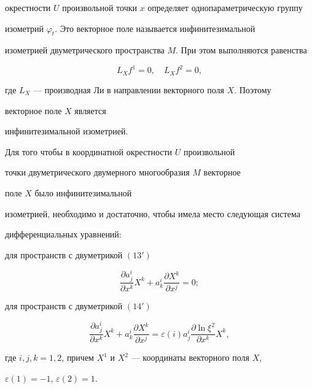 окрестности $U$ произвольной точки $x$ определяет однопараметрическую группу


изометрий $\varphi_t$. Это векторное поле называется инфинитезимальной


изометрией двуметрического пространства $M$. При этом выполняются равенства


$$


L_Xf^1=0,\quad L_Xf^2=0,


$$


где $L_X$ --- производная Ли в направлении векторного поля $X$. Поэтому 


векторное поле $X$ является


инфинитезимальной изометрией.





\begin{thm}


Для того чтобы в координатной окрестности $U$ произвольной


точки двуметрического двумерного многообразия $M$ векторное 


поле $X$ было инфинитезимальной


изометрией, необходимо и достаточно, чтобы имела место следующая система


дифференциальных уравнений\/${:}$





для пространств с двуметрикой $(13')$


\begin{equation}


\frac{\partial a_j^i}{\partial x^k}X^k+a_k^i


\frac{\partial X^k}{\partial x^j}=0;


\end{equation}





для пространств с двуметрикой $(14')$


\begin{equation}


\frac{\partial a_j^i}{\partial x^k}X^k+a_k^i\frac{\partial X^k}{\partial x^j}


=\varepsilon(i)a^i_j\frac{\partial \ln\xi^2}{\partial x^k}X^k,


\end{equation}


где $i,j,k=1,2$, причем $X^1$ и $X^2$ --- координаты векторного поля $X$,


$\varepsilon(1)= -1$, $\varepsilon(2)=1$.


\end{thm}





